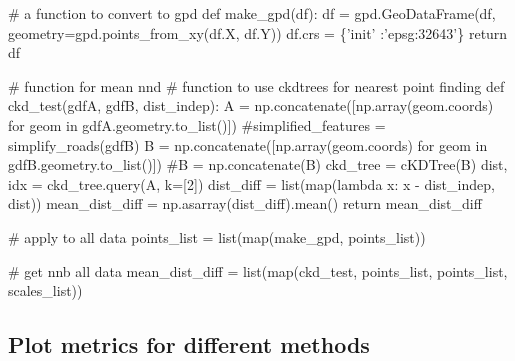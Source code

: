 \documentclass[]{article}
\newenvironment{Shaded}{}{}
\newcommand{\BuiltInTok}[1]{#1}
\newcommand{\CommentTok}[1]{\textcolor[rgb]{0.00,0.50,0.00}{#1}}
\newcommand{\ControlFlowTok}[1]{\textcolor[rgb]{0.00,0.00,1.00}{#1}}
\newcommand{\DecValTok}[1]{#1}
\newcommand{\KeywordTok}[1]{\textcolor[rgb]{0.00,0.00,1.00}{#1}}
\newcommand{\NormalTok}[1]{#1}
\newcommand{\OperatorTok}[1]{#1}
\newcommand{\StringTok}[1]{\textcolor[rgb]{0.00,0.50,0.50}{#1}}
\begin{document}
\begin{Shaded}
\begin{Highlighting}[numbers=left,,]
\CommentTok{# a function to convert to gpd}
\KeywordTok{def}\NormalTok{ make_gpd(df):}
\NormalTok{    df }\OperatorTok{=}\NormalTok{ gpd.GeoDataFrame(df, geometry}\OperatorTok{=}\NormalTok{gpd.points_from_xy(df.X, df.Y))}
\NormalTok{    df.crs }\OperatorTok{=}\NormalTok{ \{}\StringTok{'init'}\NormalTok{ :}\StringTok{'epsg:32643'}\NormalTok{\}}
    \ControlFlowTok{return}\NormalTok{ df}


\CommentTok{# function for mean nnd}
\CommentTok{# function to use ckdtrees for nearest point finding}
\KeywordTok{def}\NormalTok{ ckd_test(gdfA, gdfB, dist_indep):}
\NormalTok{    A }\OperatorTok{=}\NormalTok{ np.concatenate([np.array(geom.coords) }\ControlFlowTok{for}\NormalTok{ geom }\KeywordTok{in}\NormalTok{ gdfA.geometry.to_list()])}
    \CommentTok{#simplified_features = simplify_roads(gdfB)}
\NormalTok{    B }\OperatorTok{=}\NormalTok{ np.concatenate([np.array(geom.coords) }\ControlFlowTok{for}\NormalTok{ geom }\KeywordTok{in}\NormalTok{ gdfB.geometry.to_list()])}
    \CommentTok{#B = np.concatenate(B)}
\NormalTok{    ckd_tree }\OperatorTok{=}\NormalTok{ cKDTree(B)}
\NormalTok{    dist, idx }\OperatorTok{=}\NormalTok{ ckd_tree.query(A, k}\OperatorTok{=}\NormalTok{[}\DecValTok{2}\NormalTok{])}
\NormalTok{    dist_diff }\OperatorTok{=} \BuiltInTok{list}\NormalTok{(}\BuiltInTok{map}\NormalTok{(}\KeywordTok{lambda}\NormalTok{ x: x }\OperatorTok{-}\NormalTok{ dist_indep, dist))}
\NormalTok{    mean_dist_diff }\OperatorTok{=}\NormalTok{ np.asarray(dist_diff).mean()}
    \ControlFlowTok{return}\NormalTok{ mean_dist_diff}


\CommentTok{# apply to all data}
\NormalTok{points_list }\OperatorTok{=} \BuiltInTok{list}\NormalTok{(}\BuiltInTok{map}\NormalTok{(make_gpd, points_list))}

\CommentTok{# get nnb all data}
\NormalTok{mean_dist_diff }\OperatorTok{=} \BuiltInTok{list}\NormalTok{(}\BuiltInTok{map}\NormalTok{(ckd_test, points_list, points_list, scales_list))}
\end{Highlighting}
\end{Shaded}

\hypertarget{plot-metrics-for-different-methods}{%
\subsection{Plot metrics for different methods}\label{plot-metrics-for-different-methods}}
\end{document}

